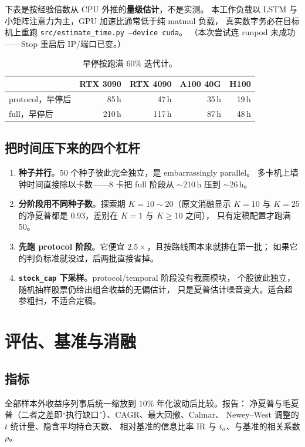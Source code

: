 \documentclass[11pt, a4paper]{ctexart}
\newcommand{\file}[1]{\texttt{\small #1}}
\begin{document}
\begin{warnbox}
下表是按经验倍数从 CPU 外推的\textbf{量级估计}，不是实测。
本工作负载以 LSTM 与小矩阵注意力为主，GPU 加速比通常低于纯 matmul 负载，
真实数字务必在目标机上重跑 \file{src/estimate\_time.py --device cuda}。
（本次尝试连 runpod 未成功——Stop 重启后 IP/端口已变。）
\end{warnbox}

\begin{table}[h]
\centering
\small
\begin{tabular}{lrrrr}
\toprule
 & RTX 3090 & RTX 4090 & A100 40G & H100 \\
\midrule
protocol，早停后 & 85\,h & 47\,h & 35\,h & 19\,h \\
full，早停后 & 210\,h & 117\,h & 87\,h & 48\,h \\
\bottomrule
\end{tabular}
\caption{早停按跑满 $60\%$ 迭代计。}
\end{table}

\subsection{把时间压下来的四个杠杆}
\begin{enumerate}
  \item \textbf{种子并行}。50 个种子彼此完全独立，是 embarrassingly parallel。
        多卡机上墙钟时间直接除以卡数——8 卡把 full 阶段从 $\sim$210\,h 压到 $\sim$26\,h。
  \item \textbf{分阶段用不同种子数}。探索期 $K{=}10\sim20$（原文消融显示
        $K{=}10$ 与 $K{=}25$ 的净夏普都是 0.93，差别在 $K{=}1$ 与 $K{\ge}10$ 之间），
        只有定稿配置才跑满 50。
  \item \textbf{先跑 protocol 阶段}。它便宜 $2.5\times$，且按路线图本来就排在第一批；
        如果它的判负标准就没过，后两批直接省掉。
  \item \textbf{\file{stock\_cap} 下采样}。protocol/temporal 阶段没有截面模块，
        个股彼此独立，随机抽样股票仍给出组合收益的无偏估计，
        只是夏普估计噪音变大。适合超参粗扫，不适合定稿。
\end{enumerate}

\section{评估、基准与消融}

\subsection{指标}
全部样本外收益序列事后统一缩放到 $10\%$ 年化波动后比较。报告：
净夏普与毛夏普（二者之差即“执行缺口”）、CAGR、最大回撤、Calmar、
Newey--West 调整的 $t$ 统计量、隐含平均持仓天数、
相对基准的信息比率 IR 与 $t_\alpha$、与基准的相关系数 $\rho$。
\end{document}
